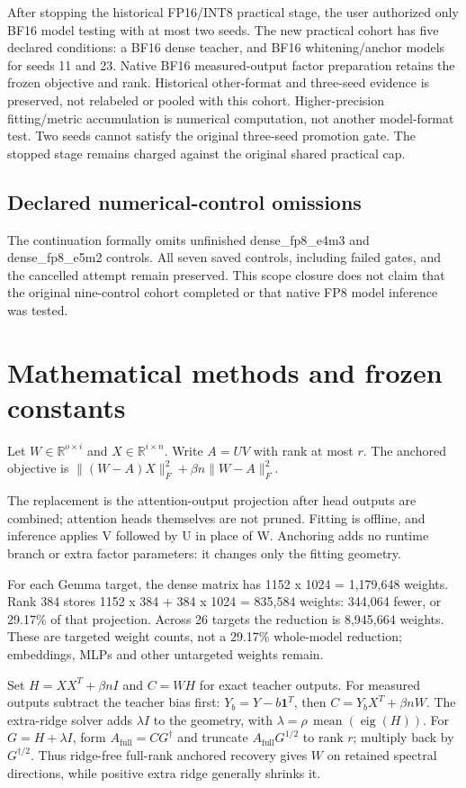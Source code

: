 \documentclass[10pt]{article}
\begin{document}
After stopping the historical FP16/INT8 practical stage, the user authorized only BF16 model testing with at most two seeds. The new practical cohort has five declared conditions: a BF16 dense teacher, and BF16 whitening/anchor models for seeds 11 and 23. Native BF16 measured-output factor preparation retains the frozen objective and rank. Historical other-format and three-seed evidence is preserved, not relabeled or pooled with this cohort. Higher-precision fitting/metric accumulation is numerical computation, not another model-format test. Two seeds cannot satisfy the original three-seed promotion gate. The stopped stage remains charged against the original shared practical cap.

\subsection{Declared numerical-control omissions}

The continuation formally omits unfinished dense\_fp8\_e4m3 and dense\_fp8\_e5m2 controls. All seven saved controls, including failed gates, and the cancelled attempt remain preserved. This scope closure does not claim that the original nine-control cohort completed or that native FP8 model inference was tested.

\section{Mathematical methods and frozen constants}

Let $W\in\mathbb{R}^{o\times i}$ and $X\in\mathbb{R}^{i\times n}$. Write $A=UV$ with rank at most $r$. The anchored objective is $\|(W-A)X\|_F^2+\beta n\|W-A\|_F^2$.

The replacement is the attention-output projection after head outputs are combined; attention heads themselves are not pruned. Fitting is offline, and inference applies V followed by U in place of W. Anchoring adds no runtime branch or extra factor parameters: it changes only the fitting geometry.

For each Gemma target, the dense matrix has 1152 x 1024 = 1,179,648 weights. Rank 384 stores 1152 x 384 + 384 x 1024 = 835,584 weights: 344,064 fewer, or 29.17\% of that projection. Across 26 targets the reduction is 8,945,664 weights. These are targeted weight counts, not a 29.17\% whole-model reduction; embeddings, MLPs and other untargeted weights remain.

Set $H=XX^T+\beta nI$ and $C=WH$ for exact teacher outputs. For measured outputs subtract the teacher bias first: $Y_b=Y-b\mathbf{1}^T$, then $C=Y_bX^T+\beta nW$. The extra-ridge solver adds $\lambda I$ to the geometry, with $\lambda=\rho\,\operatorname{mean}(\operatorname{eig}(H))$. For $G=H+\lambda I$, form $A_\mathrm{full}=CG^\dagger$ and truncate $A_\mathrm{full}G^{1/2}$ to rank $r$; multiply back by $G^{\dagger/2}$. Thus ridge-free full-rank anchored recovery gives $W$ on retained spectral directions, while positive extra ridge generally shrinks it.
\end{document}
